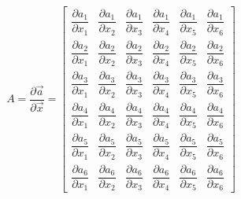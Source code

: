 \begin{equation}
	A = \dfrac{\partial \vec a}{\partial \vec x} =
	\begin{bmatrix}
		\dfrac{\partial  a_1}{\partial  x_1}&
		\dfrac{\partial  a_1}{\partial  x_2}&
		\dfrac{\partial  a_1}{\partial  x_3}&
		\dfrac{\partial  a_1}{\partial  x_4}&
		\dfrac{\partial  a_1}{\partial  x_5}&
		\dfrac{\partial  a_1}{\partial  x_6}
		\\[1em]
		\dfrac{\partial  a_2}{\partial  x_1}&
		\dfrac{\partial  a_2}{\partial  x_2}&
		\dfrac{\partial  a_2}{\partial  x_3}&
		\dfrac{\partial  a_2}{\partial  x_4}&
		\dfrac{\partial  a_2}{\partial  x_5}&
		\dfrac{\partial  a_2}{\partial  x_6}
		\\[1em]
		\dfrac{\partial  a_3}{\partial  x_1}&
		\dfrac{\partial  a_3}{\partial  x_2}&
		\dfrac{\partial  a_3}{\partial  x_3}&
		\dfrac{\partial  a_3}{\partial  x_4}&
		\dfrac{\partial  a_3}{\partial  x_5}&
		\dfrac{\partial  a_3}{\partial  x_6}
		\\[1em]
		\dfrac{\partial  a_4}{\partial  x_1}&
		\dfrac{\partial  a_4}{\partial  x_2}&
		\dfrac{\partial  a_4}{\partial  x_3}&
		\dfrac{\partial  a_4}{\partial  x_4}&
		\dfrac{\partial  a_4}{\partial  x_5}&
		\dfrac{\partial  a_4}{\partial  x_6}
		\\[1em]
		\dfrac{\partial  a_5}{\partial  x_1}&
		\dfrac{\partial  a_5}{\partial  x_2}&
		\dfrac{\partial  a_5}{\partial  x_3}&
		\dfrac{\partial  a_5}{\partial  x_4}&
		\dfrac{\partial  a_5}{\partial  x_5}&
		\dfrac{\partial  a_5}{\partial  x_6}
		\\[1em]
		\dfrac{\partial  a_6}{\partial  x_1}&
		\dfrac{\partial  a_6}{\partial  x_2}&
		\dfrac{\partial  a_6}{\partial  x_3}&
		\dfrac{\partial  a_6}{\partial  x_4}&
		\dfrac{\partial  a_6}{\partial  x_5}&
		\dfrac{\partial  a_6}{\partial  x_6}
	\end{bmatrix}
\end{equation}
